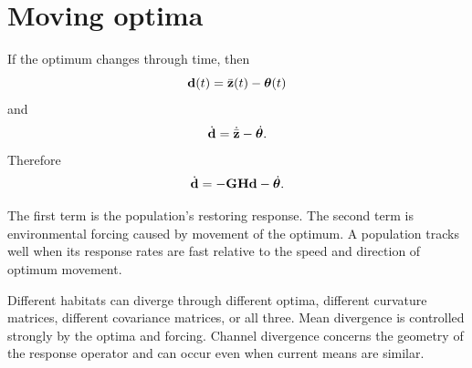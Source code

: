 \section{Moving optima}

If the optimum changes through time, then
\begin{equation}
\mathbf d(t)=\bar{\mathbf z}(t)-\boldsymbol{\theta}(t)
\end{equation}
and
\begin{equation}
\dot{\mathbf d}=\dot{\bar{\mathbf z}}-\dot{\boldsymbol{\theta}}.
\end{equation}
Therefore
\begin{equation}
\dot{\mathbf d}=-\mathbf{G}\mathbf{H}\mathbf d-\dot{\boldsymbol{\theta}}.
\label{eq:movingOptimumDynamics}
\end{equation}

\inwords The first term is the population's restoring response. The second term is environmental forcing caused by movement of the optimum. A population tracks well when its response rates are fast relative to the speed and direction of optimum movement.

\begin{biobox}
Different habitats can diverge through different optima, different curvature matrices, different covariance matrices, or all three. Mean divergence is controlled strongly by the optima and forcing. Channel divergence concerns the geometry of the response operator and can occur even when current means are similar.
\end{biobox}
